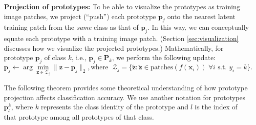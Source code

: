 \documentclass{article}
\theoremstyle{definition}
\theoremstyle{remark}
\begin{document}
\textbf{Projection of prototypes:} To be able to visualize the prototypes as training image patches, we project (``push'') each prototype $\mathbf{p}_j$ onto the nearest latent training patch from the \textit{same} class as that of $\mathbf{p}_j$. In this way, we can conceptually equate each prototype with a training image patch. (Section \ref{sec:visualization} discusses how we visualize the projected prototypes.)
Mathematically, for prototype $\mathbf{p}_j$ of class $k$, i.e., $\mathbf{p}_j \in \mathbf{P}_k$, we perform the following update:
\[
\mathbf{p}_j \leftarrow \arg\min_{\mathbf{z} \in \mathcal{Z}_j} \|\mathbf{z} - \mathbf{p}_j\|_2, \textrm{where }\; \mathcal{Z}_j = \{\tilde{\mathbf{z}}: \tilde{\mathbf{z}} \in \text{patches}(f(\mathbf{x}_i)) \;\forall i \text{ s.t. } y_i = k\}.
\]

The following theorem provides some theoretical understanding of how prototype projection affects classification accuracy. We use another notation for prototypes $\mathbf{p}^k_l$, where $k$ represents the class identity of the prototype and $l$ is the index of that prototype among all prototypes of that class.
\end{document}
